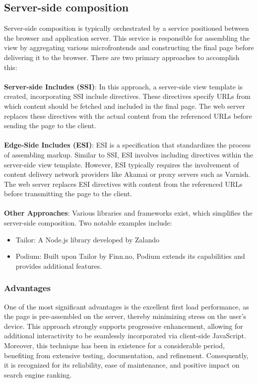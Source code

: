 \subsection{Server-side composition}
Server-side composition is typically orchestrated by a service positioned between the browser and application server. This service is responsible for assembling the view by aggregating various microfrontends and constructing the final page before delivering it to the browser. There are two primary approaches to accomplish this:\\\\
\textbf{Server-side Includes (SSI)}: 
In this approach, a server-side view template is created, incorporating SSI include directives. These directives specify URLs from which content should be fetched and included in the final page. The web server replaces these directives with the actual content from the referenced URLs before sending the page to the client.\\\\
\textbf{Edge-Side Includes (ESI)}:
ESI is a specification that standardizes the process of assembling markup. Similar to SSI, ESI involves including directives within the server-side view template. However, ESI typically requires the involvement of content delivery network providers like Akamai or proxy servers such as Varnish. The web server replaces ESI directives with content from the referenced URLs before transmitting the page to the client.\\\\
\textbf{Other Approaches}:
Various libraries and frameworks exist, which simplifies the server-side composition. Two notable examples include:
\begin{itemize}
   \item Tailor: A Node.js library developed by Zalando
   \item Podium: Built upon Tailor by Finn.no, Podium extends its capabilities and provides additional features. \cite{MFInAction}
\end{itemize}

\subsubsection{Advantages}
One of the most significant advantages is the excellent first load performance, as the page is pre-assembled on the server, thereby minimizing stress on the user's device. This approach strongly supports progressive enhancement, allowing for additional interactivity to be seamlessly incorporated via client-side JavaScript. Moreover, this technique has been in existence for a considerable period, benefiting from extensive testing, documentation, and refinement. Consequently, it is recognized for its reliability, ease of maintenance, and positive impact on search engine ranking. \cite{MFInAction}


